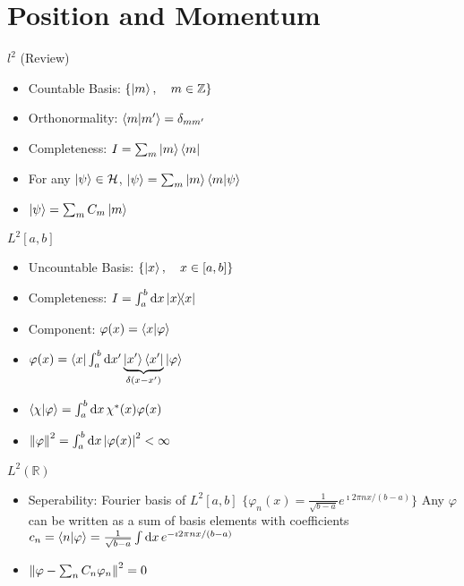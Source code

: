 \documentclass[a4paper,twoside,master.tex]{subfiles}
\begin{document}
\chapter{Position and Momentum}

$ l^2 $ (Review)
\begin{itemize}
    \item Countable Basis: $ \{\ket{m} \qc m \in \mathbb{Z}\} $
    \item Orthonormality: $ \bra{m} \ket{m'} = \delta_{mm'} $
    \item Completeness: $ I = \sum_{m} \ket{m} \bra{m} $ 
    \item For any $ \ket{\psi} \in \mathcal{H} $, $ \ket{\psi} = \sum_{m} \ket{m} \bra{m} \ket{\psi} $ 
    \item $ \ket{\psi} = \sum_{m} C_m \ket{m} $
\end{itemize}

$ L^2 [a,b] $ 
\begin{itemize}
    \item Uncountable Basis: $ \{\ket{x} \qc x \in [a, b]\} $ 
    \item Completeness: $ I = \int_{a}^{b} \dd{x} \op{x} $
    \item Component: $ \varphi(x) = \bra{x} \ket{\varphi} $
    \item $ \varphi(x) = \bra{x} \int_a^b \dd{x'} \underbrace{ \ket{x'} \bra{x'} }_{\delta(x-x')} \ket{\varphi} $
    \item $ \bra{\chi} \ket{\varphi} = \int_a^b \dd{x} \chi^* (x) \varphi(x) $
    \item $ \norm{\varphi}^2 = \int_a^b \dd{x} \abs{\varphi(x)}^2 < \infty $
\end{itemize}

$ L^2 (\mathbb{R}) $
\begin{itemize}
    \item Seperability:
        \subitem Fourier basis of $ L^2 [a,b] $
        $ \{\varphi_n(x) = \frac{1}{\sqrt{b-a}} e^{\imath 2 \pi n x / (b-a)}\} $
        Any $\varphi$ can be written as a sum of basis elements with coefficients $ c_n = \bra{n} \ket{\varphi} = \frac{1}{\sqrt{b-a}} \int \dd{x} e^{-\imath 2 \pi n x / (b-a)} $
    \item $ \norm{\varphi - \sum_n C_n \varphi_n}^2 = 0 $
\end{itemize}
\end{document}
